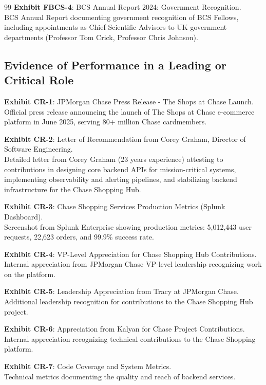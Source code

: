 \documentclass[11pt]{article}
\begin{document}
\begin{thebibliography}{99}
\textbf{Exhibit FBCS-4}: BCS Annual Report 2024: Government Recognition.
\\BCS Annual Report documenting government recognition of BCS Fellows, including appointments as Chief Scientific Advisors to UK government departments (Professor Tom Crick, Professor Chris Johnson).

\subsection*{Evidence of Performance in a Leading or Critical Role}

\textbf{Exhibit CR-1}: JPMorgan Chase Press Release - The Shops at Chase Launch.
\\Official press release announcing the launch of The Shops at Chase e-commerce platform in June 2025, serving 80+ million Chase cardmembers.

\textbf{Exhibit CR-2}: Letter of Recommendation from Corey Graham, Director of Software Engineering.
\\Detailed letter from Corey Graham (23 years experience) attesting to \drs contributions in designing core backend APIs for mission-critical systems, implementing observability and alerting pipelines, and stabilizing backend infrastructure for the Chase Shopping Hub.

\textbf{Exhibit CR-3}: Chase Shopping Services Production Metrics (Splunk Dashboard).
\\Screenshot from Splunk Enterprise showing production metrics: 5,012,443 user requests, 22,623 orders, and 99.9\% success rate.

\textbf{Exhibit CR-4}: VP-Level Appreciation for Chase Shopping Hub Contributions.
\\Internal appreciation from JPMorgan Chase VP-level leadership recognizing \drs work on the platform.

\textbf{Exhibit CR-5}: Leadership Appreciation from Tracy at JPMorgan Chase.
\\Additional leadership recognition for \drs contributions to the Chase Shopping Hub project.

\textbf{Exhibit CR-6}: Appreciation from Kalyan for Chase Project Contributions.
\\Internal appreciation recognizing \drs technical contributions to the Chase Shopping platform.

\textbf{Exhibit CR-7}: Code Coverage and System Metrics.
\\Technical metrics documenting the quality and reach of \drs backend services.


\end{thebibliography}
\end{document}

